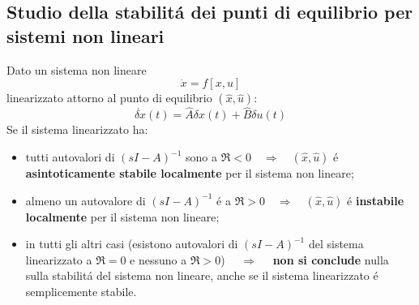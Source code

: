 \documentclass[../main.tex]{subfiles}
\begin{document}
	\subsection{Studio della stabilit\'a dei punti di equilibrio per sistemi non lineari}
		Dato un sistema non lineare
		\[
			\dot x = f\left[ x,u \right]
		\]
		linearizzato attorno al punto di equilibrio $ (\hat x, \hat u) $:
		\[
			\dot{\delta x}(t) = \hat A \delta x(t) + \hat B \delta u(t)
		\]
		Se il sistema linearizzato ha:
		\begin{itemize}
			\item
				tutti autovalori di $(sI-A)^{-1}$ sono a $ \Re < 0 \quad \Rightarrow \quad (\hat x, \hat u) $ \'e \textbf{asintoticamente stabile localmente} per il sistema non lineare;
			\item
				almeno un autovalore di $(sI-A)^{-1}$ \'e a $ \Re > 0 \quad \Rightarrow \quad (\hat x, \hat u) $ \'e \textbf{instabile localmente} per il sistema non lineare;
			\item
				in tutti gli altri casi (esistono autovalori di $(sI-A)^{-1}$ del sistema linearizzato a $ \Re = 0 $ e nessuno a $ \Re > 0 $) $ \quad \Rightarrow \quad $ \textbf{non si conclude} nulla sulla stabilit\'a del sistema non lineare, anche se il sistema linearizzato \'e semplicemente stabile.
		\end{itemize}
	
\end{document}
